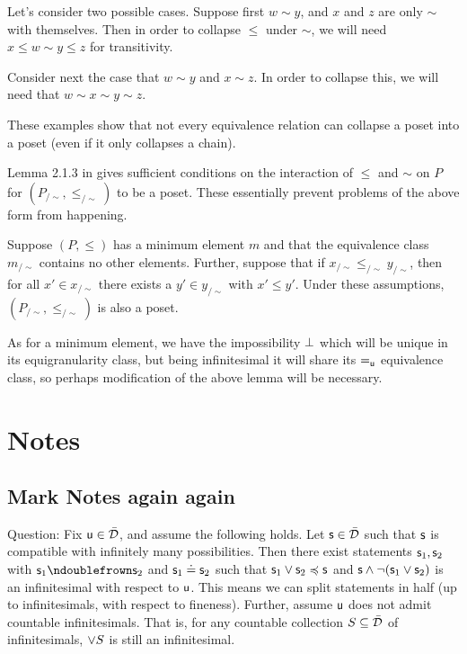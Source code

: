 \documentclass[10pt, onecolumn, longbibliography, nofootinbib]{revtex4-2}
\begin{document}
Let's consider two possible cases. Suppose first $w\sim y$, and $x$ and $z$ are only $\sim$ with themselves. Then in order to collapse $\leq$ under $\sim$, we will need $x \leq w\sim y \leq z$ for transitivity. 

Consider next the case that $w\sim y$ and $x\sim z$. In order to collapse this, we will need that $w\sim x\sim y \sim z$.

These examples show that not every equivalence relation can collapse a poset into a poset (even if it only collapses a chain). 

Lemma 2.1.3 in \cite{quotientposets} gives sufficient conditions on the interaction of $\leq$ and $\sim$ on $P$ for $(P_{/\sim},\leq_{/\sim})$ to be a poset. These essentially prevent problems of the above form from happening. 

\begin{prop}
Suppose $(P,\leq)$ has a minimum element $m$ and that the equivalence class $m_{/\sim}$ contains no other elements. Further, suppose that if $x_{/\sim} \leq_{/\sim} y_{/\sim}$, then for all $x'\in x_{/\sim}$ there exists a $y'\in y_{/\sim}$ with $x'\leq y'$. 
Under these assumptions, $(P_{/\sim},\leq_{/\sim})$ is also a poset.
\end{prop}

As for a minimum element, we have the impossibility $\impossibility$ which will be unique in its equigranularity class, but being infinitesimal it will share its $\equ$ equivalence class, so perhaps modification of the above lemma will be necessary. 

\section{Notes}

\subsection{Mark Notes again again}

Question: Fix $\stmt[u]\in\tdomain$, and assume the following holds. Let $\stmt\in\tdomain$ such that $\stmt$ is compatible with infinitely many possibilities. Then there exist statements $\stmt_1,\stmt_2$ with $\stmt_1\ncomp\stmt_2$ and $\stmt_1\eqgran\stmt_2$ such that $\stmt_1\OR\stmt_2\narrower\stmt$ and $\stmt\AND\NOT(\stmt_1\OR\stmt_2)$ is an infinitesimal with respect to $\stmt[u]$. This means we can split statements in half (up to infinitesimals, with respect to fineness). 
Further, assume $\stmt[u]$ does not admit countable infinitesimals. That is, for any countable collection $S\subseteq\tdomain$ of infinitesimals, $\OR S$ is still an infinitesimal. 
\end{document}
